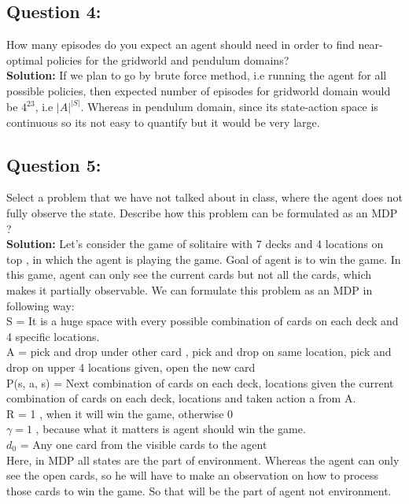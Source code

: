 \documentclass{article}
\begin{document}
\subsection*{Question 4:} How many episodes do you expect an agent should need in order to find near-optimal policies for the gridworld and pendulum domains?\\

\textbf{Solution:} If we plan to go by brute force method, i.e running the agent for all possible policies, then expected number of episodes for gridworld domain would be $4^ {23}$, i.e $|A|^ {|S|}$. Whereas in pendulum domain, since its state-action space is continuous so its not easy to quantify but it would be very large.

\subsection*{Question 5:} Select a problem that we have not talked about in class, where the agent does not fully observe the state. Describe how this problem can be formulated as an MDP ?\\

\textbf{Solution:} Let's consider the game of solitaire with 7 decks and 4 locations on top , in which the agent is playing the game. Goal of agent is to win the game. In this game, agent can only see the current cards but not all the cards, which makes it partially observable. 
We can formulate this problem as an MDP in following way: \\

\noindent
S = It is a huge space with every possible combination of cards on each deck and 4 specific locations. \\
A = pick and drop under other card , pick and drop on same location, pick and drop on upper 4 locations given, open the new card\\
P(s, a, s\textprime) = Next combination of cards on each deck, locations given the current combination of cards on each deck, locations and taken action a from A.\\
R = 1 , when it will win the game, otherwise 0\\
$\gamma = 1$ , because what it matters is agent should win the game.\\
$d_0$ = Any one card from the visible cards to the agent\\

\noindent
Here, in MDP all states are the part of environment. Whereas the agent can only see the open cards, so he will have to make an observation on how to process those cards to win the game. So that will be the part of agent not environment.
\end{document}
